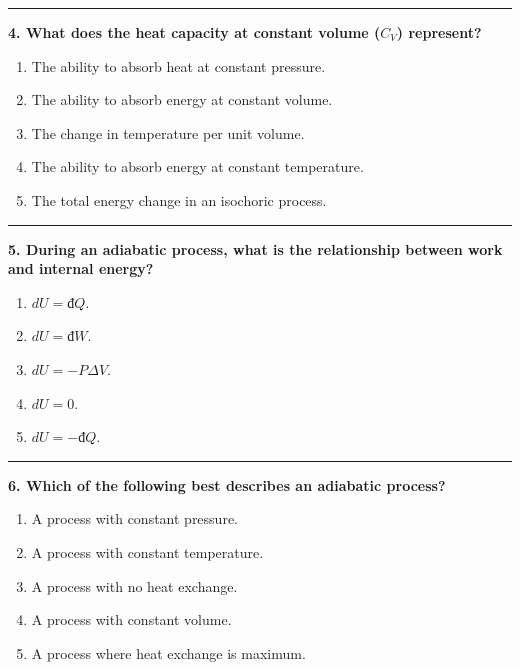 \documentclass[
  9pt,
]{extbook}
\providecommand{\tightlist}{%
  \setlength{\itemsep}{0pt}\setlength{\parskip}{0pt}}
\theoremstyle{definition}
\theoremstyle{definition}
\theoremstyle{definition}
\theoremstyle{remark}
\begin{document}
\begin{center}\rule{0.5\linewidth}{0.5pt}\end{center}

\textbf{4. What does the heat capacity at constant volume (\(C_V\)) represent?}

\begin{enumerate}
\def\labelenumi{\alph{enumi}.}
\tightlist
\item
  The ability to absorb heat at constant pressure.
\item
  The ability to absorb energy at constant volume.
\item
  The change in temperature per unit volume.
\item
  The ability to absorb energy at constant temperature.
\item
  The total energy change in an isochoric process.
\end{enumerate}

\begin{center}\rule{0.5\linewidth}{0.5pt}\end{center}

\textbf{5. During an adiabatic process, what is the relationship between work and internal energy?}

\begin{enumerate}
\def\labelenumi{\alph{enumi}.}
\tightlist
\item
  \(dU = đQ\).
\item
  \(dU = đW\).
\item
  \(dU = -P \Delta V\).
\item
  \(dU = 0\).
\item
  \(dU = -đQ\).
\end{enumerate}

\begin{center}\rule{0.5\linewidth}{0.5pt}\end{center}

\textbf{6. Which of the following best describes an adiabatic process?}

\begin{enumerate}
\def\labelenumi{\alph{enumi}.}
\tightlist
\item
  A process with constant pressure.
\item
  A process with constant temperature.
\item
  A process with no heat exchange.
\item
  A process with constant volume.
\item
  A process where heat exchange is maximum.
\end{enumerate}
\end{document}

